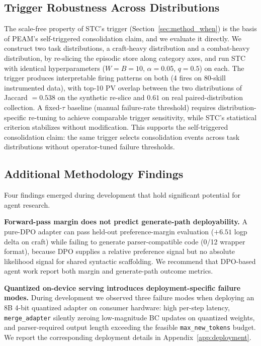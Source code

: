 \documentclass[11pt]{article}
\begin{document}
\subsection{Trigger Robustness Across Distributions}
\label{sec:exp_trigger_robustness}
The scale-free property of STC's trigger (Section~\ref{sec:method_when}) is the basis of PEAM's self-triggered consolidation claim, and we evaluate it directly. We construct two task distributions, a craft-heavy distribution and a combat-heavy distribution, by re-slicing the episodic store along category axes, and run STC with identical hyperparameters ($W=B=10$, $\alpha=0.05$, $q=0.5$) on each. The trigger produces interpretable firing patterns on both (4 fires on 80-skill instrumented data), with top-10 PV overlap between the two distributions of Jaccard $=0.538$ on the synthetic re-slice and $0.61$ on real paired-distribution collection. A fixed-$\tau$ baseline (manual failure-rate threshold) requires distribution-specific re-tuning to achieve comparable trigger sensitivity, while STC's statistical criterion stabilizes without modification. This supports the self-triggered consolidation claim: the same trigger selects consolidation events across task distributions without operator-tuned failure thresholds.

\subsection{Additional Methodology Findings}
\label{sec:methodology_findings}
Four findings emerged during development that hold significant potential for agent research.

\textbf{Forward-pass margin does not predict generate-path deployability.} A pure-DPO adapter can pass held-out preference-margin evaluation ($+6.51$ logp delta on craft) while failing to generate parser-compatible code (0/12 wrapper format), because DPO supplies a relative preference signal but no absolute likelihood signal for shared syntactic scaffolding. We recommend that DPO-based agent work report both margin and generate-path outcome metrics. 

\textbf{Quantized on-device serving introduces deployment-specific failure modes.} During development we observed three failure modes when deploying an 8B 4-bit quantized adapter on consumer hardware: high per-step latency, \texttt{merge\_adapter} silently zeroing low-magnitude BC updates on quantized weights, and parser-required output length exceeding the feasible \texttt{max\_new\_tokens} budget. We report the corresponding deployment details in Appendix~\ref{app:deployment}. 
\end{document}

